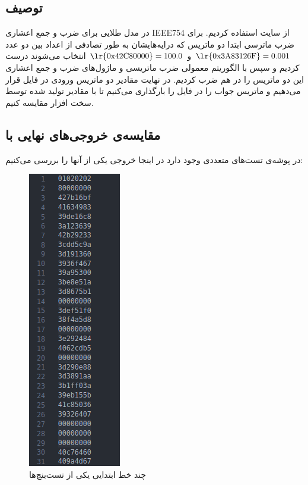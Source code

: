 \documentclass[12pt,onecolumn,a4paper,fleqn]{article}
\begin{document}
\subsection{توصیف }


در مدل طلایی برای ضرب و جمع اعشاری IEEE754 از سایت
استفاده کردیم. برای ضرب ماترسی ابتدا دو ماتریس که درایه‌هایشان به طور تصادفی از اعداد بین دو عدد
\(\text{\lr{0x3A83126F}} = 0.001\)
و
\({\text{\lr{0x42C80000}} = 100.0}\)
انتخاب می‌شوند درست کردیم و سپس با الگوریتم معمولی ضرب ماتریسی و ماژول‌های ضرب و جمع اعشاری  این دو ماتریس را در هم ضرب کردیم. در نهایت مقادیر دو ماتریس ورودی در فایل
قرار می‌دهیم و ماتریس جواب را در فایل
را بارگذاری می‌کنیم تا با مقادیر تولید شده توسط سخت افزار مقایسه کنیم. 


\pagebreak

\subsection{مقایسه‌ی خروجی‌های نهایی با }

در پوشه‌ی  تست‌های متعددی وجود دارد در اینجا خروجی یکی از آنها را بررسی می‌کنیم:

\begin{figure}[h]
	\centering
	\includegraphics[width=0.25\linewidth]{source/memory_init.png}
	\caption{چند خط ابتدایی یکی‌ از تست‌بنچ‌ها}
\end{figure}

\pagebreak
\end{document}
